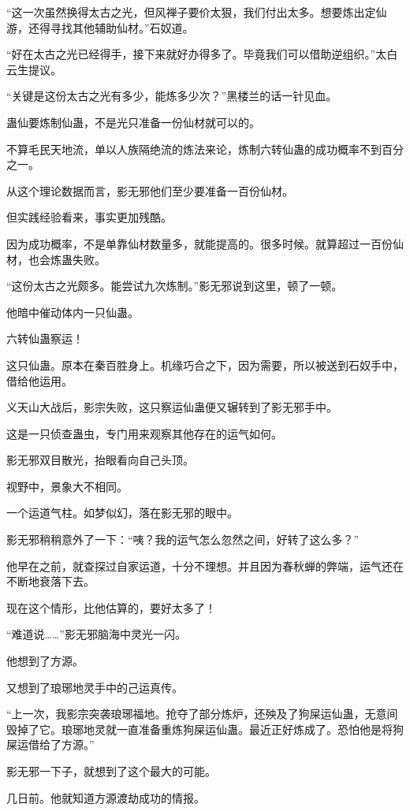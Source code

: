 \begin{this_body}
“这一次虽然换得太古之光，但风禅子要价太狠，我们付出太多。想要炼出定仙游，还得寻找其他辅助仙材。”石奴道。

“好在太古之光已经得手，接下来就好办得多了。毕竟我们可以借助逆组织。”太白云生提议。

“关键是这份太古之光有多少，能炼多少次？”黑楼兰的话一针见血。

蛊仙要炼制仙蛊，不是光只准备一份仙材就可以的。

不算毛民天地流，单以人族隔绝流的炼法来论，炼制六转仙蛊的成功概率不到百分之一。

从这个理论数据而言，影无邪他们至少要准备一百份仙材。

但实践经验看来，事实更加残酷。

因为成功概率，不是单靠仙材数量多，就能提高的。很多时候。就算超过一百份仙材，也会炼蛊失败。

“这份太古之光颇多。能尝试九次炼制。”影无邪说到这里，顿了一顿。

他暗中催动体内一只仙蛊。

六转仙蛊察运！

这只仙蛊。原本在秦百胜身上。机缘巧合之下，因为需要，所以被送到石奴手中，借给他运用。

义天山大战后，影宗失败，这只察运仙蛊便又辗转到了影无邪手中。

这是一只侦查蛊虫，专门用来观察其他存在的运气如何。

影无邪双目散光，抬眼看向自己头顶。

视野中，景象大不相同。

一个运道气柱。如梦似幻，落在影无邪的眼中。

影无邪稍稍意外了一下：“咦？我的运气怎么忽然之间，好转了这么多？”

他早在之前，就查探过自家运道，十分不理想。并且因为春秋蝉的弊端，运气还在不断地衰落下去。

现在这个情形，比他估算的，要好太多了！

“难道说……”影无邪脑海中灵光一闪。

他想到了方源。

又想到了琅琊地灵手中的己运真传。

“上一次，我影宗突袭琅琊福地。抢夺了部分炼炉，还殃及了狗屎运仙蛊，无意间毁掉了它。琅琊地灵就一直准备重炼狗屎运仙蛊。最近正好炼成了。恐怕他是将狗屎运借给了方源。”

影无邪一下子，就想到了这个最大的可能。

几日前。他就知道方源渡劫成功的情报。


\end{this_body}
